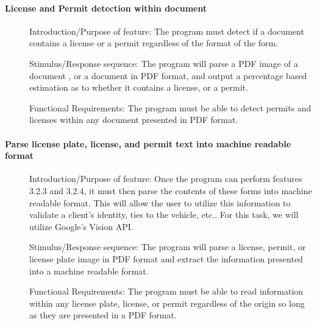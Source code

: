 \documentclass[article, onecolumn, draftclsnofoot,10pt, compsoc]{IEEEtran}
\begin{document}
\paragraph{License and Permit detection within document}\vspace{.5cm}
\begin{description}
\item [] Introduction/Purpose of feature: The program must detect if a document contains a license or a permit regardless of the format of the form.
\item [] Stimulus/Response sequence: The program will parse a PDF image of a document , or a document in PDF format, and output a percentage based estimation as to whether it contains a license, or a permit.
\item [] Functional Requirements: The program must be able to detect permits and licenses within any document presented in PDF format.
\end{description}

\paragraph{Parse license plate, license, and permit text into machine readable format}\vspace{.5cm}
\begin{description}
\item [] Introduction/Purpose of feature: Once the program can perform features 3.2.3 and 3.2.4, it must then parse the contents of these forms into machine readable format. This will allow the user to utilize this information to validate a client’s identity, ties to the vehicle, etc.. For this task, we will utilize Google’s Vision API.
\item [] Stimulus/Response sequence: The program will parse a license, permit, or license plate image in PDF format and extract the information presented into a machine readable format. 
\item [] Functional Requirements: The program must be able to read information within any license plate, license, or permit regardless of the origin so long as they are presented in a PDF format.
\end{description}
\end{document}
